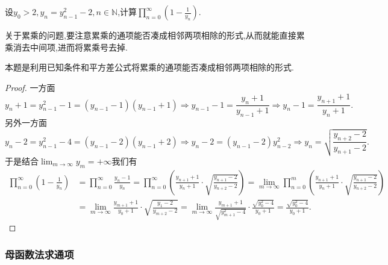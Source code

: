 \documentclass[../../main.tex]{subfiles}
\begin{document}
\begin{example}
设\(y_0>2,y_n=y_{n - 1}^{2}-2,n\in\mathbb{N}\),计算\(\prod_{n = 0}^{\infty}(1 - \frac{1}{y_n})\).  
\end{example}
\begin{note}
关于累乘的问题,要注意累乘的通项能否凑成相邻两项相除的形式,从而就能直接累乘消去中间项,进而将累乘号去掉.

本题是利用已知条件和平方差公式将累乘的通项能否凑成相邻两项相除的形式.
\end{note}
\begin{proof}
一方面
\[
y_n + 1=y_{n - 1}^{2}-1=(y_{n - 1}-1)(y_{n - 1}+1)\Rightarrow y_{n - 1}-1=\frac{y_n + 1}{y_{n - 1}+1}\Rightarrow y_n - 1=\frac{y_{n + 1}+1}{y_n + 1}.
\]
另外一方面
\[
y_n - 2=y_{n - 1}^{2}-4=(y_{n - 1}-2)(y_{n - 1}+2)\Rightarrow y_n - 2=(y_{n - 1}-2)y_{n - 2}^{2}\Rightarrow y_n=\sqrt{\frac{y_{n + 2}-2}{y_{n + 1}-2}}.
\]
于是结合\(\lim_{m\rightarrow\infty}y_m = +\infty\)我们有
\begin{align*}
\prod_{n = 0}^{\infty}\left(1-\frac{1}{y_n}\right)&=\prod_{n=0}^{\infty}{\frac{y_n-1}{y_n}}=\prod_{n = 0}^{\infty}\left(\frac{y_{n + 1}+1}{y_n + 1}\cdot\sqrt{\frac{y_{n + 1}-2}{y_{n + 2}-2}}\right)
=\lim_{m\rightarrow\infty}\prod_{n = 0}^{m}\left(\frac{y_{n + 1}+1}{y_n + 1}\cdot\sqrt{\frac{y_{n + 1}-2}{y_{n + 2}-2}}\right)\\
&=\lim_{m\rightarrow\infty}\frac{y_{m + 1}+1}{y_0 + 1}\cdot\sqrt{\frac{y_1 - 2}{y_{m + 2}-2}}
=\lim_{m\rightarrow\infty}\frac{y_{m + 1}+1}{\sqrt{y_{m + 1}^{2}-4}}\cdot\frac{\sqrt{y_0^{2}-4}}{y_0 + 1}
=\frac{\sqrt{y_0^{2}-4}}{y_0 + 1}.
\end{align*}
\end{proof}





\subsubsection{母函数法求通项}
\end{document}
